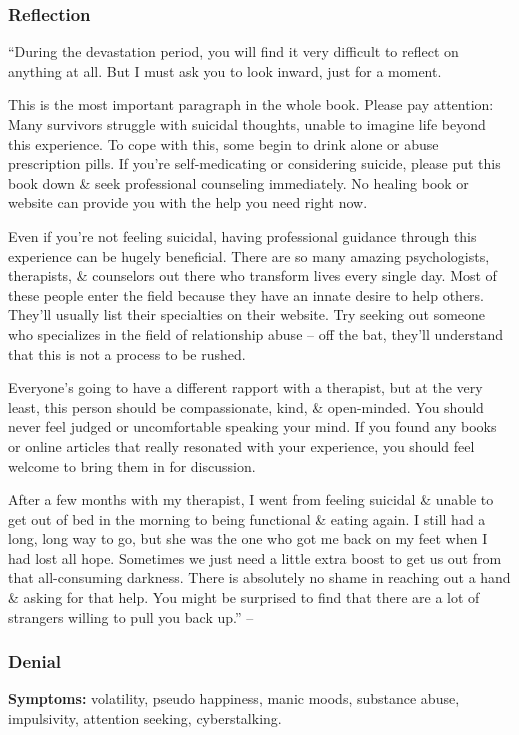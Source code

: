 \documentclass{article}
\numberwithin{equation}{section}
\begin{document}
\subsubsection{Reflection}
``During the devastation period, you will find it very difficult to reflect on anything at all. But I must ask you to look inward, just for a moment.

This is the most important paragraph in the whole book. Please pay attention: Many survivors struggle with suicidal thoughts, unable to imagine life beyond this experience. To cope with this, some begin to drink alone or abuse prescription pills. If you're self-medicating or considering suicide, please put this book down \& seek professional counseling immediately. No healing book or website can provide you with the help you need right now.

Even if you're not feeling suicidal, having professional guidance through this experience can be hugely beneficial. There are so many amazing psychologists, therapists, \& counselors out there who transform lives every single day. Most of these people enter the field because they have an innate desire to help others. They'll usually list their specialties on their website. Try seeking out someone who specializes in the field of relationship abuse -- off the bat, they'll understand that this is not a process to be rushed.

Everyone's going to have a different rapport with a therapist, but at the very least, this person should be compassionate, kind, \& open-minded. You should never feel judged or uncomfortable speaking your mind. If you found any books or online articles that really resonated with your experience, you should feel welcome to bring them in for discussion.

After a few months with my therapist, I went from feeling suicidal \& unable to get out of bed in the morning to being functional \& eating again. I still had a long, long way to go, but she was the one who got me back on my feet when I had lost all hope. Sometimes we just need a little extra boost to get us out from that all-consuming darkness. There is absolutely no shame in reaching out a hand \& asking for that help. You might be surprised to find that there are a lot of strangers willing to pull you back up.'' -- \cite[pp. 94--95]{MacKenzie2015}

\subsubsection{Denial}
\textbf{Symptoms:} volatility, pseudo happiness, manic moods, substance abuse, impulsivity, attention seeking, cyberstalking.
\end{document}
